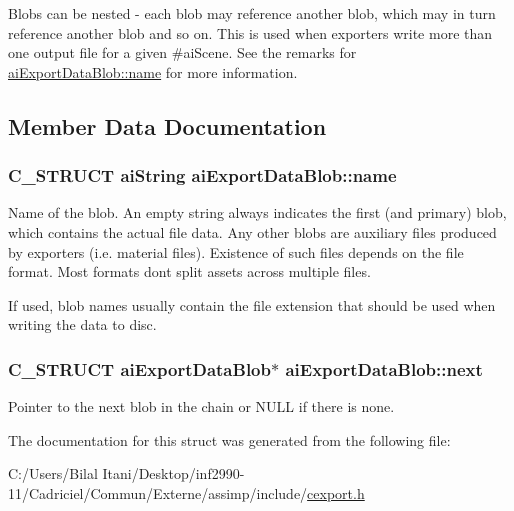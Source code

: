 Blobs can be nested -\/ each blob may reference another blob, which may in turn reference another blob and so on. This is used when exporters write more than one output file for a given \#ai\+Scene. See the remarks for \hyperlink{structai_export_data_blob_af7f006ac5ad818c0d81d520a84f74c3e}{ai\+Export\+Data\+Blob\+::name} for more information. 

\subsection{Member Data Documentation}
\subsubsection[{\texorpdfstring{name}{name}}]{\setlength{\rightskip}{0pt plus 5cm}C\+\_\+\+S\+T\+R\+U\+CT {\bf ai\+String} ai\+Export\+Data\+Blob\+::name}\hypertarget{structai_export_data_blob_af7f006ac5ad818c0d81d520a84f74c3e}{}\label{structai_export_data_blob_af7f006ac5ad818c0d81d520a84f74c3e}
Name of the blob. An empty string always indicates the first (and primary) blob, which contains the actual file data. Any other blobs are auxiliary files produced by exporters (i.\+e. material files). Existence of such files depends on the file format. Most formats don\textquotesingle{}t split assets across multiple files.

If used, blob names usually contain the file extension that should be used when writing the data to disc. 
\subsubsection[{\texorpdfstring{next}{next}}]{\setlength{\rightskip}{0pt plus 5cm}C\+\_\+\+S\+T\+R\+U\+CT {\bf ai\+Export\+Data\+Blob}$\ast$ ai\+Export\+Data\+Blob\+::next}\hypertarget{structai_export_data_blob_a3e98fa760f45983ff1bccec6715f3817}{}\label{structai_export_data_blob_a3e98fa760f45983ff1bccec6715f3817}
Pointer to the next blob in the chain or N\+U\+LL if there is none. 

The documentation for this struct was generated from the following file\+:\begin{DoxyCompactItemize}
\item 
C\+:/\+Users/\+Bilal Itani/\+Desktop/inf2990-\/11/\+Cadriciel/\+Commun/\+Externe/assimp/include/\hyperlink{cexport_8h}{cexport.\+h}\end{DoxyCompactItemize}
